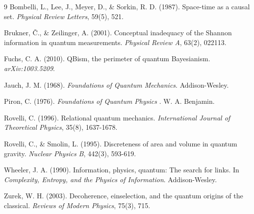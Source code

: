 \documentclass[aps,preprint,showpacs,showkeys]{revtex4}%
\begin{document}
\begin{thebibliography}{9}
 Bombelli, L., Lee, J., Meyer, D., \& Sorkin, R. D.
(1987). Space-time as a causal set. \textit{Physical Review Letters}, 59(5),
521.

 Brukner, \v{C}., \& Zeilinger, A. (2001). Conceptual
inadequacy of the Shannon information in quantum measurements. \textit{%
Physical Review A}, 63(2), 022113.

 Fuchs, C. A. (2010). QBism, the perimeter of quantum
Bayesianism. \textit{arXiv:1003.5209}.

 Jauch, J. M. (1968). \textit{Foundations of Quantum
Mechanics}. Addison-Wesley.

 Piron, C. (1976). \textit{Foundations of Quantum Physics}%
. W. A. Benjamin.

 Rovelli, C. (1996). Relational quantum mechanics. 
\textit{International Journal of Theoretical Physics}, 35(8), 1637-1678.

 Rovelli, C., \& Smolin, L. (1995). Discreteness of
area and volume in quantum gravity. \textit{Nuclear Physics B}, 442(3),
593-619.

 Wheeler, J. A. (1990). Information, physics, quantum:
The search for links. In \textit{Complexity, Entropy, and the Physics of
Information}. Addison-Wesley.

 Zurek, W. H. (2003). Decoherence, einselection, and the
quantum origins of the classical. \textit{Reviews of Modern Physics}, 75(3),
715.
\end{thebibliography}
\end{document}
